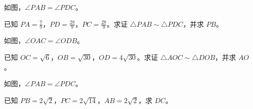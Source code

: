 \documentclass{exam-zh}
\begin{document}

\begin{problem}[points=10]
  \noindent
  \begin{minipage}[t]{\dimexpr\linewidth-60mm-6mm\relax}
    \vspace{0pt}
    如图，$\angle PAB=\angle PDC$。

已知 $PA=\frac{7}{9}$，$PD=\frac{28}{9}$，$PC=\frac{28}{9}$。求证 $\triangle PAB\sim\triangle PDC$，并求 $PB$。
    
  \end{minipage}\hfill
  \begin{diagramcoltikz}{60mm}{沿题设等角的顶点顺序，找出两组三角形的对应边。}
  }
  \end{diagramcoltikz}
  \par\medskip
  \answerarea[48mm]
\end{problem}



\begin{problem}[points=10]
  \noindent
  \begin{minipage}[t]{\dimexpr\linewidth-60mm-6mm\relax}
    \vspace{0pt}
    如图，$\angle OAC=\angle ODB$。

已知 $OC=\sqrt{6}$，$OB=\sqrt{30}$，$OD=4\sqrt{30}$。求证 $\triangle AOC\sim\triangle DOB$，并求 $AO$。
    
  \end{minipage}\hfill
  \begin{diagramcoltikz}{60mm}{先用对顶角补齐第二组等角，再按顶点顺序配边。}
  }
  \end{diagramcoltikz}
  \par\medskip
  \answerarea[48mm]
\end{problem}



\begin{problem}[points=10]
  \noindent
  \begin{minipage}[t]{\dimexpr\linewidth-60mm-6mm\relax}
    \vspace{0pt}
    如图，$\angle PAB=\angle PDC$。

已知 $PB=2\sqrt{2}$，$PC=2\sqrt{14}$，$AB=2\sqrt{2}$，求 $DC$。
    
  \end{minipage}\hfill
  \begin{diagramcoltikz}{60mm}{沿题设等角的顶点顺序，找出两组三角形的对应边。}
  }
  \end{diagramcoltikz}
  \par\medskip
  \answerarea[48mm]
\end{problem}
\end{document}
